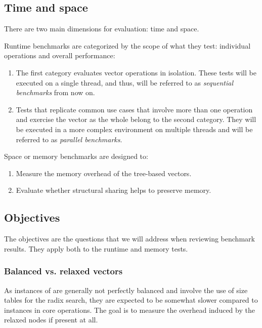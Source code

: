 
\subsection{Time and space}
There are two main dimensions for evaluation: time and space.

Runtime benchmarks are categorized by the scope of what they test: individual operations and overall performance:
\begin{enumerate}
    \item The first category evaluates vector operations in isolation. These tests will be executed on a single thread, and thus, will be referred to as \emph{sequential benchmarks} from now on.
    \item Tests that replicate common use cases that involve more than one operation and exercise the vector as the whole belong to the second category. They will be executed in a more complex environment on multiple threads and will be referred to as \emph{parallel benchmarks}.
\end{enumerate}

Space or memory benchmarks are designed to:
\begin{enumerate}
    \item Measure the memory overhead of the tree-based vectors.
    \item Evaluate whether structural sharing helps to preserve memory.
\end{enumerate}

\subsection{Objectives}
The objectives are the questions that we will address when reviewing benchmark results. They apply both to the runtime and memory tests.

\subsubsection*{Balanced vs. relaxed vectors}
As instances of \rrbtree{} are generally not perfectly balanced and involve the use of size tables for the radix search, they are expected to be somewhat slower compared to \rbtree{} instances in core operations. The goal is to measure the overhead induced by the relaxed nodes if present at all.

